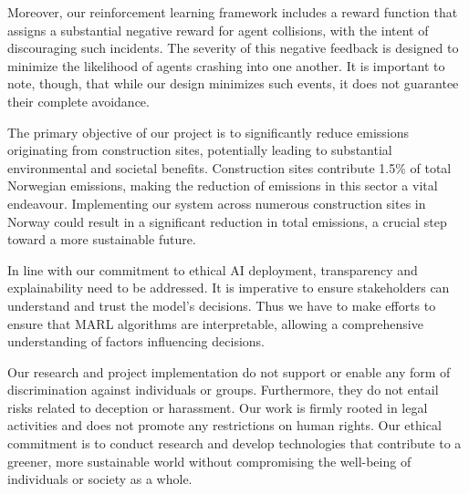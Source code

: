 \documentclass[conference]{IEEEtran}
\begin{document}
Moreover, our reinforcement learning framework includes a reward function that assigns a substantial
negative reward for agent collisions, with the intent of discouraging such incidents. The severity of
this negative feedback is designed to minimize the likelihood of agents crashing into one another. It
is important to note, though, that while our design minimizes such events, it does not guarantee their
complete avoidance.


The primary objective of our project is to significantly reduce \coo{} emissions originating from
construction sites, potentially leading to substantial environmental and societal benefits.
Construction sites contribute 1.5\% of total Norwegian \coo{} emissions, making the reduction of
emissions in this sector a vital endeavour. Implementing our system across numerous construction sites
in Norway could result in a significant reduction in total \coo{} emissions, a crucial step toward a more
sustainable future.

In line with our commitment to ethical AI deployment, transparency and explainability need to be
addressed. It is imperative to ensure stakeholders can understand and trust the model's decisions.
Thus we have to make efforts to ensure that MARL algorithms are interpretable, allowing a comprehensive
understanding of factors influencing decisions.

Our research and project implementation do not support or enable any form of discrimination against
individuals or groups. Furthermore, they do not entail risks related to deception or harassment.
Our work is firmly rooted in legal activities and does not promote any restrictions on human rights.
Our ethical commitment is to conduct research and develop technologies that contribute to a greener,
more sustainable world without compromising the well-being of individuals or society as a whole.

\newpage


\nocite{*}        %


\end{document}
